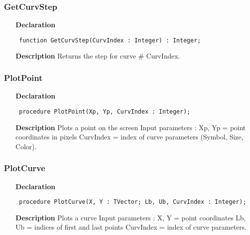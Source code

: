 \documentclass[12pt,a4paper,oneside]{report}
\newcommand{\declarationitem}[1]{\textbf{#1}}
\newcommand{\descriptiontitle}[1]{\textbf{#1}}
\newcommand{\code}[1]{\texttt{#1}}
\begin{document}
\subsubsection{GetCurvStep}
\label{uplot-GetCurvStep}
\begin{itemize}\item[\declarationitem{Declaration}\hfill]
	\begin{flushleft}
		\code{
			function GetCurvStep(CurvIndex : Integer) : Integer;}
		
	\end{flushleft}
	
	\par
	\item[\descriptiontitle{Description}]
	Returns the step for curve {\#} CurvIndex.
	
\end{itemize}
\subsubsection{PlotPoint}
\label{uplot-PlotPoint}
\begin{itemize}\item[\declarationitem{Declaration}\hfill]
	\begin{flushleft}
		\code{
			procedure PlotPoint(Xp, Yp, CurvIndex : Integer);}
		
	\end{flushleft}
	
	\par
	\item[\descriptiontitle{Description}]
	Plots a point on the screen Input parameters : Xp, Yp = point coordinates in pixels CurvIndex = index of curve parameters (Symbol, Size, Color).
	
\end{itemize}
\subsubsection{PlotCurve}
\label{uplot-PlotCurve}
\begin{itemize}\item[\declarationitem{Declaration}\hfill]
	\begin{flushleft}
		\code{
			procedure PlotCurve(X, Y : TVector; Lb, Ub, CurvIndex : Integer);}
		
	\end{flushleft}
	
	\par
	\item[\descriptiontitle{Description}]
	Plots a curve Input parameters : X, Y = point coordinates Lb, Ub = indices of first and last points CurvIndex = index of curve parameters.
	
\end{itemize}
\end{document}
